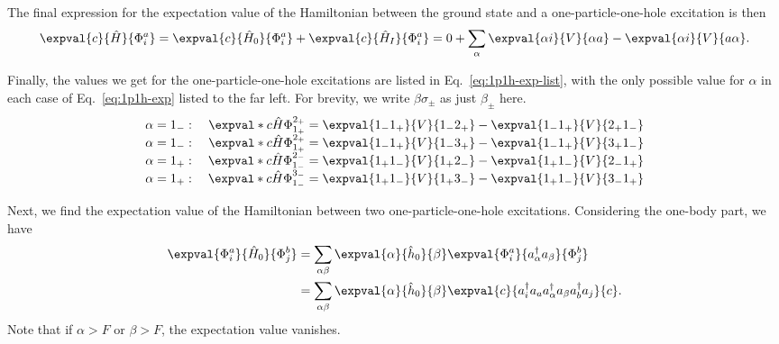 The final expression for the expectation value of the Hamiltonian between the ground state and a one-particle-one-hole excitation is then
\begin{equation}\label{eq:1p1h-exp}
    \expval{c}{\hat{H}}{\Phi_i^a} = \expval{c}{\hat{H}_0}{\Phi_i^a} + \expval{c}{\hat{H}_I}{\Phi_i^a} = 0 + \sum_{\alpha} \expval{\alpha i}{V}{\alpha a} - \expval{\alpha i}{V}{a \alpha}.
\end{equation}

Finally, the values we get for the one-particle-one-hole excitations are listed in Eq.~\eqref{eq:1p1h-exp-list}, with the only possible value for $\alpha$ in each case of Eq.~\eqref{eq:1p1h-exp} listed to the far left.
For brevity, we write $\beta\sigma_{\pm}$ as just $\beta_{\pm}$ here.
\begin{equation}\label{eq:1p1h-exp-list}
    \arraycolsep=1.4pt
    \begin{array}{crcl}
        \alpha = 1_{-}: \quad
        & \expval*{c}{\hat{H}}{\Phi_{1_{+}}^{2_{+}}}
        & = &
        \expval{1_{-} 1_{+}}{V}{1_{-} 2_{+}} - \expval{1_{-} 1_{+}}{V}{2_{+} 1_{-}} \\

        \alpha = 1_{-}: \quad
        & \expval*{c}{\hat{H}}{\Phi_{1_{+}}^{2_{+}}}
        & = &
        \expval{1_{-} 1_{+}}{V}{1_{-} 3_{+}} - \expval{1_{-} 1_{+}}{V}{3_{+} 1_{-}} \\

        \alpha = 1_{+}: \quad
        & \expval*{c}{\hat{H}}{\Phi_{1_{-}}^{2_{-}}}
        & = &
        \expval{1_{+} 1_{-}}{V}{1_{+} 2_{-}} - \expval{1_{+} 1_{-}}{V}{2_{-} 1_{+}} \\

        \alpha = 1_{+}: \quad
        & \expval*{c}{\hat{H}}{\Phi_{1_{-}}^{3_{-}}}
        & = &
        \expval{1_{+} 1_{-}}{V}{1_{+} 3_{-}} - \expval{1_{+} 1_{-}}{V}{3_{-} 1_{+}}
    \end{array}
\end{equation}

Next, we find the expectation value of the Hamiltonian between two one-particle-one-hole excitations.
Considering the one-body part, we have
\begin{align*}
    \expval{\Phi_i^a}{\hat{H}_0}{\Phi_j^b} &= \sum_{\alpha\beta} \expval{\alpha}{\hat{h}_0}{\beta} \expval{\Phi_i^a}{a_\alpha^\dagger a_\beta}{\Phi_j^b} \\
    &= \sum_{\alpha\beta} \expval{\alpha}{\hat{h}_0}{\beta} \expval{c}{a_i^\dagger a_a  a_\alpha^\dagger a_\beta a_b^\dagger a_j}{c}.
\end{align*}
Note that if $\alpha > F$ or $\beta > F$, the expectation value vanishes.

